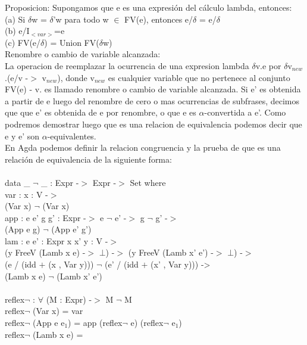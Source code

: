 \documentclass{book}
\begin{document}
 Proposicion: Supongamos que e es una expresión del cálculo lambda, entonces:\\
 (a) Si $\delta$w = $\delta$'w para todo w $\in$ FV(e), entonces e/$\delta$ = e/$\delta$ \\
 (b) e/I$_{<var>}$=e \\
 (c) FV(e/$\delta$) = Union FV($\delta$w) \\

 Renombre o cambio de variable alcanzada:\\
 La operacion de reemplazar la ocurrencia de una expresion lambda $\delta$v.e por $\delta$v$_{new}$.(e/v -$>$ v$_{new}$), donde v$_{new}$ es cualquier variable que no pertenece al conjunto FV(e) - {v}. es llamado renombre o cambio de variable alcanzada.
 Si e' es obtenida a partir de e luego del renombre de cero o mas ocurrencias de subfrases, decimos que que e' es obtenida de e por renombre, o que e es $\alpha$-convertida a e'. Como podremos demostrar luego que es una relacion de equivalencia podemos decir que e y e' son $\alpha$-equivalentes.\\
 En Agda podemos definir la relacion congruencia y la prueba de que es una relación de equivalencia de la siguiente forma:\\ \\
 
data \_ $\neg$ \_ : Expr -$>$ Expr -$>$ Set where \\
var : {x : V} -$>$ \\
  (Var x) $\neg$ (Var x) \\
app : {e e' g g' : Expr} -$>$ e $\neg$ e' -$>$ g $\neg$ g' -$>$ \\
  (App e g) $\neg$ (App e' g') \\
lam : {e e' : Expr} {x x' y : V} -$>$ \\
  (y FreeV (Lamb x e) -$>$ $\bot$) -$>$ (y FreeV (Lamb x' e') -$>$ $\bot$) -$>$ \\
            (e / (idd $+$ (x , Var y))) $\neg$ (e' / (idd $+$ (x' , Var y))) -> \\
            (Lamb x e) $\neg$ (Lamb x' e') \\ \\

reflex$\neg$ : $\forall$ (M : Expr) -$>$ M $\neg$ M \\ 
reflex$\neg$ (Var x) = var \\
reflex$\neg$ (App e e$_{1}$) = app (reflex$\neg$ e) (reflex$\neg$ e$_{1}$) \\
reflex$\neg$ (Lamb x e) =  \\
 
 
\end{document}
